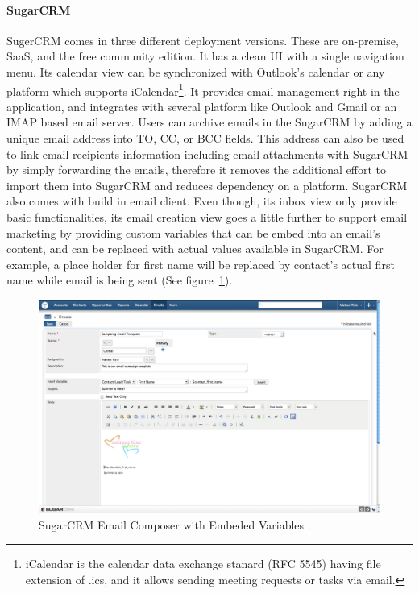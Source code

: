 \paragraph{SugarCRM}
SugerCRM comes in three different deployment versions. These are on-premise, \ac{SaaS}, and the free community edition. It has a clean \ac{UI} with a single navigation menu. Its calendar view can be synchronized with Outlook's calendar or any platform which supports iCalendar\footnote{iCalendar is the calendar data exchange stanard (RFC 5545) having file extension of .ics, and it allows sending meeting requests or tasks via email.}. It provides email management right in the application, and integrates with several platform like Outlook and Gmail or an \ac{IMAP} based email server. Users can archive emails in the SugarCRM by adding a unique email address into TO, \ac{CC}, or \ac{BCC} fields. This address can also be used to link email recipients information including email attachments with SugarCRM by simply forwarding the emails, therefore it removes the additional effort to import them into SugarCRM and reduces dependency on a platform. SugarCRM also comes with build in email client. Even though, its inbox view only provide basic functionalities, its email creation view goes a little further to support email marketing by providing custom variables that can be embed into an email's content, and can be replaced with actual values available in SugarCRM. For example, a place holder for first name will be replaced by contact's actual first name while email is being sent (See figure~\ref{fig:SugarCRM-Create_Email}). 
\vspace{1cm}

\begin{figure}[H]
	\includegraphics[width=1.00\textwidth]{imgs/SugarCRM-Create_Email.png}
	\caption[SugarCRM Email Composer with Embeded Variables]{SugarCRM Email Composer with Embeded Variables \citep{SugarCRMInc.2013}.}
	\label{fig:SugarCRM-Create_Email}
\end{figure}

